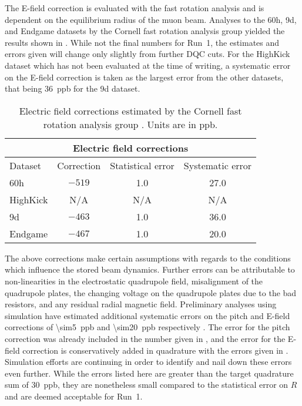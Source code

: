 

The E-field correction is evaluated with the fast rotation analysis and is dependent on the equilibrium radius of the muon beam. Analyses to the 60h, 9d, and Endgame datasets by the Cornell fast rotation analysis group yielded the results shown in . While not the final numbers for Run~1, the estimates and errors given will change only slightly from further DQC cuts. For the HighKick dataset which has not been evaluated at the time of writing, a systematic error on the E-field correction is taken as the largest error from the other datasets, that being \SI{36}{ppb} for the 9d dataset.


\begin{table}
\centering
\renewcommand{\arraystretch}{1.2}
\begin{tabular*}{\linewidth}{@{\extracolsep{\fill}}lccc}
  \hline
    \multicolumn{4}{c}{\textbf{Electric field corrections}} \\
  \hline\hline
    Dataset & Correction & Statistical error & Systematic error \\
  \hline
    60h & $-519$ & 1.0 & 27.0 \\
    HighKick & N/A & N/A & N/A \\
    9d & $-463$ & 1.0 & 36.0 \\
    Endgame & $-467$ & 1.0 & 20.0 \\
  \hline
\end{tabular*}
\caption[Electric field corrections estimated by the Cornell fast rotation analysis group]{Electric field corrections estimated by the Cornell fast rotation analysis group \cite{AntoineEField60h,AntoineEField9d,AntoineEFieldEndgame}. Units are in ppb.}
\label{tab:EfieldCorrections}
\end{table}



The above corrections make certain assumptions with regards to the conditions which influence the stored beam dynamics. Further errors can be attributable to non-linearities in the electrostatic quadrupole field, misalignment of the quadrupole plates, the changing voltage on the quadrupole plates due to the bad resistors, and any residual radial magnetic field. Preliminary analyses using simulation have estimated additional systematic errors on the pitch and E-field corrections of \SI{\sim5}{ppb} and \SI{\sim20}{ppb} respectively \cite{DaveRubinElbaBadResistors,DaveRubinBadResistorsUpdate}. The error for the pitch correction was already included in the number given in , and the error for the E-field correction is conservatively added in quadrature with the errors given in . Simulation efforts are continuing in order to identify and nail down these errors even further. While the errors listed here are greater than the target quadrature sum of \SI{30}{ppb}, they are nonetheless small compared to the statistical error on $R$ and are deemed acceptable for Run~1.


